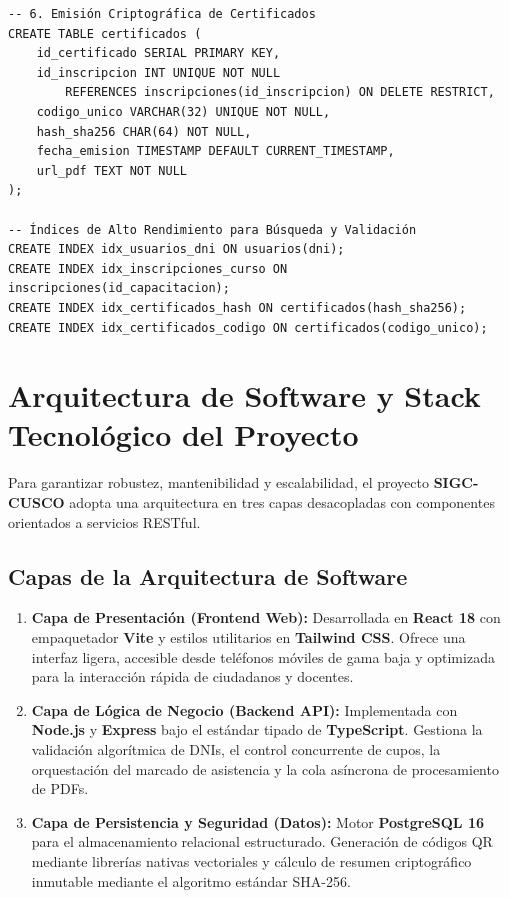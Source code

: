 \documentclass[11pt,a4paper]{article}
\begin{document}
\begin{tcolorbox}[breakable, colback=CodeBg, colframe=black!40, title=\textbf{Script DDL PostgreSQL 16 -- SIGC-CUSCO}, arc=1mm]
\begin{verbatim}
-- 6. Emisión Criptográfica de Certificados
CREATE TABLE certificados (
    id_certificado SERIAL PRIMARY KEY,
    id_inscripcion INT UNIQUE NOT NULL 
        REFERENCES inscripciones(id_inscripcion) ON DELETE RESTRICT,
    codigo_unico VARCHAR(32) UNIQUE NOT NULL,
    hash_sha256 CHAR(64) NOT NULL,
    fecha_emision TIMESTAMP DEFAULT CURRENT_TIMESTAMP,
    url_pdf TEXT NOT NULL
);

-- Índices de Alto Rendimiento para Búsqueda y Validación
CREATE INDEX idx_usuarios_dni ON usuarios(dni);
CREATE INDEX idx_inscripciones_curso ON inscripciones(id_capacitacion);
CREATE INDEX idx_certificados_hash ON certificados(hash_sha256);
CREATE INDEX idx_certificados_codigo ON certificados(codigo_unico);
\end{verbatim}
\end{tcolorbox}

\section{Arquitectura de Software y Stack Tecnológico del Proyecto}

Para garantizar robustez, mantenibilidad y escalabilidad, el proyecto \textbf{SIGC-CUSCO} adopta una arquitectura en tres capas desacopladas con componentes orientados a servicios RESTful.

\subsection{Capas de la Arquitectura de Software}
\begin{enumerate}\setlength\itemsep{0.2em}
    \item \textbf{Capa de Presentación (Frontend Web):} Desarrollada en \textbf{React 18} con empaquetador \textbf{Vite} y estilos utilitarios en \textbf{Tailwind CSS}. Ofrece una interfaz ligera, accesible desde teléfonos móviles de gama baja y optimizada para la interacción rápida de ciudadanos y docentes.
    \item \textbf{Capa de Lógica de Negocio (Backend API):} Implementada con \textbf{Node.js} y \textbf{Express} bajo el estándar tipado de \textbf{TypeScript}. Gestiona la validación algorítmica de DNIs, el control concurrente de cupos, la orquestación del marcado de asistencia y la cola asíncrona de procesamiento de PDFs.
    \item \textbf{Capa de Persistencia y Seguridad (Datos):} Motor \textbf{PostgreSQL 16} para el almacenamiento relacional estructurado. Generación de códigos QR mediante librerías nativas vectoriales y cálculo de resumen criptográfico inmutable mediante el algoritmo estándar SHA-256.
\end{enumerate}
\end{document}
